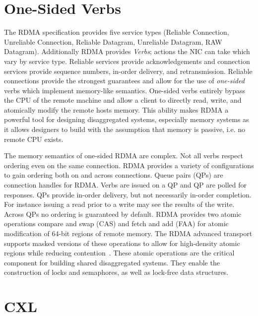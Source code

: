 \documentclass[12pt]{ucsddissertation}
\begin{document}
\section{One-Sided Verbs}
The RDMA specification provides five service types (Reliable Connection, Unreliable Connection,
Reliable Datagram, Unreliable Datagram, RAW Datagram). Additionally RDMA provides \textit{Verbs};
actions the NIC can take which vary by service type. Reliable services provide acknowledgements and
connection services provide sequence numbers, in-order delivery, and retransmission. Reliable
connections provide the strongest guarantees and allow for the use of \textit{one-sided} verbs which
implement memory-like semantics. One-sided verbs entirely bypass the CPU of the remote machine and
allow a client to directly read, write, and atomically modify the remote hosts memory. This ability
makes RDMA a powerful tool for designing disaggregated systems, especially memory systems as it
allows designers to build with the assumption that memory is passive, i.e. no remote CPU exists. 


The memory semantics of one-sided RDMA are complex. Not all verbs respect ordering even on the same
connection. RDMA provides a variety of configurations to gain ordering both on and across
connections. Queue pairs (QPs) are connection handles for RDMA. Verbs are issued on a QP and QP are
polled for responses. QPs provide in-order delivery, but not necessarily in-order completion. For
instance issuing a read prior to a write may see the results of the write. Across QPs no ordering is
guaranteed by default. RDMA provides two atomic operations compare and swap (CAS) and fetch and add
(FAA) for atomic modification of 64-bit regions of remote memory. The RDMA advanced transport
supports masked versions of these operations to allow for high-density atomic regions while reducing
contention~\cite{rdma-masked-cas}. These atomic operations are the critical component for building
shared disaggregated systems. They enable the construction of locks and semaphores, as well as
lock-free data structures.

\section{CXL}
\end{document}

